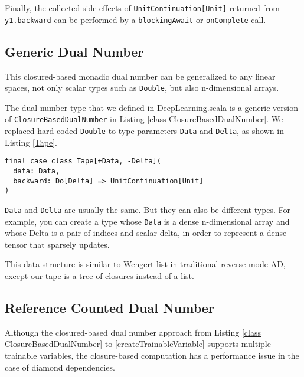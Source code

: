 Finally, the collected side effects of \lstinline{UnitContinuation[Unit]} returned from \lstinline{y1.backward} can be performed by a \href{https://javadoc.io/page/com.thoughtworks.future/future_2.11/latest/com/thoughtworks/continuation$$UnitContinuationOps.html#blockingAwait():A}{\lstinline{blockingAwait}} or \href{https://javadoc.io/page/com.thoughtworks.future/future_2.11/latest/com/thoughtworks/continuation$$ContinuationOps.html#onComplete(continue:A=>R):R}{\lstinline{onComplete}} call.

\subsection{Generic Dual Number}
This closured-based monadic dual number can be generalized to any linear spaces, not only scalar types such as \lstinline{Double}, but also n-dimensional arrays.

The dual number type that we defined in DeepLearning.scala is a generic version of \lstinline{ClosureBasedDualNumber} in Listing \ref{class ClosureBasedDualNumber}. We replaced hard-coded \lstinline{Double} to type parameters \lstinline{Data} and \lstinline{Delta}, as shown in Listing \ref{Tape}.

\begin{lstlisting}[float={htbp},caption={Generic closured-based monadic dual number}, label={Tape}]
final case class Tape[+Data, -Delta](
  data: Data,
  backward: Do[Delta] => UnitContinuation[Unit]
)
\end{lstlisting}

\lstinline{Data} and \lstinline{Delta} are usually the same. But they can also be different types. For example, you can create a type whose \lstinline{Data} is a dense n-dimensional array and whose {Delta} is a pair of indices and scalar delta, in order to represent a dense tensor that sparsely updates.

This data structure is similar to Wengert list in traditional reverse mode AD, except our tape is a tree of closures instead of a list.

\subsection{Reference Counted Dual Number}

Although the closured-based dual number approach from Listing \ref{class ClosureBasedDualNumber} to \ref{createTrainableVariable} supports multiple \glspl{trainable variable}, the closure-based computation has a performance issue in the case of diamond dependencies.

